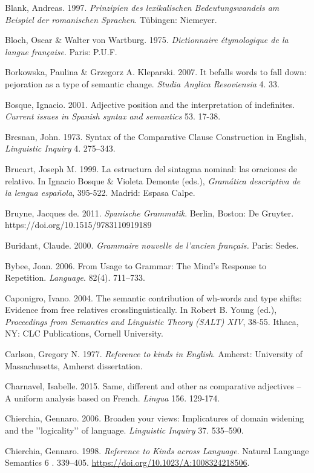 \documentclass[output=paper]{langscibook}
\begin{document}
Blank, Andreas. 1997. \textit{Prinzipien des lexikalischen Bedeutungswandels am Beispiel der romanischen Sprachen}. Tübingen: Niemeyer.

Bloch, Oscar \& Walter von Wartburg. 1975. \textit{Dictionnaire étymologique de la langue française}. Paris: P.U.F.

Borkowska, Paulina \& Grzegorz A. Kleparski. 2007. It befalls words to fall down: pejoration as a type of semantic change. \textit{Studia Anglica Resoviensia} 4. 33.

Bosque, Ignacio. 2001. Adjective position and the interpretation of indefinites. \textit{Current issues in Spanish syntax and semantics} 53. 17-38.

Bresnan, John. 1973. Syntax of the Comparative Clause Construction in English, \textit{Linguistic Inquiry} 4. 275–343.

Brucart, Joseph M. 1999. La estructura del sintagma nominal: las oraciones de relativo. In Ignacio Bosque \& Violeta Demonte (eds.), \textit{Gramática descriptiva de la lengua española}, 395-522. Madrid: Espasa Calpe.

Bruyne, Jacques de. 2011. \textit{Spanische Grammatik}. Berlin, Boston: De Gruyter. https://doi.org/10.1515/9783110919189

Buridant, Claude. 2000. \textit{Grammaire nouvelle de l'ancien français.} Paris: Sedes. 

Bybee, Joan. 2006. From Usage to Grammar: The Mind’s Response to Repetition. \textit{Language}. 82(4). 711–733.

Caponigro, Ivano. 2004. The semantic contribution of wh-words and type shifts: Evidence from free relatives crosslinguistically. In Robert B. Young (ed.), \textit{Proceedings from Semantics and Linguistic Theory (SALT)} \textit{XIV}, 38-55. Ithaca, NY: CLC Publications, Cornell University.

Carlson, Gregory N. 1977. \textit{Reference to kinds in English}. Amherst: University of Massachusetts, Amherst dissertation.

Charnavel, Isabelle. 2015. Same, different and other as comparative adjectives – A uniform analysis based on French. \textit{Lingua} 156. 129-174.

Chierchia, Gennaro. 2006. Broaden your views: Implicatures of domain widening and the '{}'logicality'{}' of language. \textit{Linguistic Inquiry} 37. 535–590.

Chierchia, Gennaro. 1998. \textit{Reference to Kinds across Language}. Natural Language Semantics 6 . 339–405. \url{https://doi.org/10.1023/A:1008324218506}.
\end{document}
